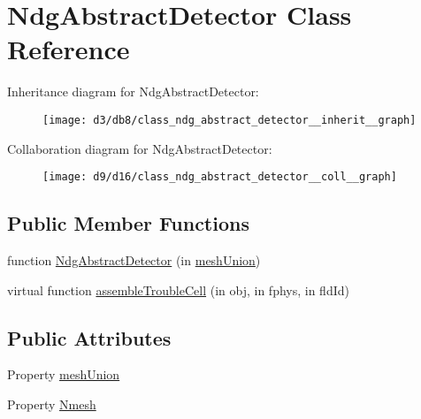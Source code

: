 \hypertarget{class_ndg_abstract_detector}{}\section{Ndg\+Abstract\+Detector Class Reference}
\label{class_ndg_abstract_detector}


Inheritance diagram for Ndg\+Abstract\+Detector\+:
\nopagebreak
\begin{figure}[H]
\begin{center}
\leavevmode
\texttt{[image: d3/db8/class\_ndg\_abstract\_detector\_\_inherit\_\_graph]}
\end{center}
\end{figure}


Collaboration diagram for Ndg\+Abstract\+Detector\+:
\nopagebreak
\begin{figure}[H]
\begin{center}
\leavevmode
\texttt{[image: d9/d16/class\_ndg\_abstract\_detector\_\_coll\_\_graph]}
\end{center}
\end{figure}
\subsection*{Public Member Functions}
\begin{DoxyCompactItemize}
\item 
function \hyperlink{class_ndg_abstract_detector_a5b6419f15d9de03be595da974f02abf2}{Ndg\+Abstract\+Detector} (in \hyperlink{class_ndg_abstract_detector_aadb2239f6a1bfb04410b56818c202c0c}{mesh\+Union})
\item 
virtual function \hyperlink{class_ndg_abstract_detector_a90e497a5af4d9e97af0f39960131b4ec}{assemble\+Trouble\+Cell} (in obj, in fphys, in fld\+Id)
\end{DoxyCompactItemize}
\subsection*{Public Attributes}
\begin{DoxyCompactItemize}
\item 
Property \hyperlink{class_ndg_abstract_detector_aadb2239f6a1bfb04410b56818c202c0c}{mesh\+Union}
\item 
Property \hyperlink{class_ndg_abstract_detector_a7836bdfeed5d39fbcbdf69c55a75b775}{Nmesh}
\end{DoxyCompactItemize}


